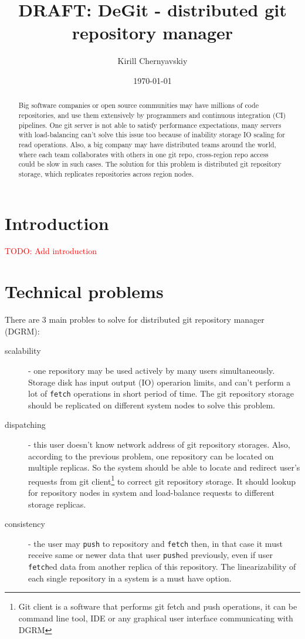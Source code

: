 \documentclass[12pt,oneside]{article}
\date{\small\today}
\title{%
  DRAFT: DeGit - distributed git repository manager\\
  \colorbox{firebrick}{\small\sffamily\color{white}{White Paper}}}
\author{Kirill Chernyavskiy}
\newcommand{\code}[1]{\texttt{#1}}
\newcommand{\todo}[1]{\textcolor{red}{TODO: #1}}
\begin{document}
\raggedbottom

\maketitle
\begin{abstract}
  Big software companies or open source communities 
  may have millions of code repositories,
  and use them extensively by programmers and continuous integration (CI) pipelines.
  One git server is not able to satisfy performance expectations,
  many servers with load-balancing can't solve this issue too because
  of inability storage IO scaling for read operations.
  Also, a big company may have distributed teams around the world,
  where each team collaborates with others in one git repo,
  cross-region repo access could be slow in such cases.
  The solution for this problem is distributed git repository storage,
  which replicates repositories across region nodes.
\end{abstract}

\section{Introduction}

\todo{Add introduction}

\section{Technical problems}

There are 3 main probles to solve for distributed git repository manager (DGRM):
\begin{description}
\item[scalability] - one repository may be used actively by many users simultaneously. Storage disk
  has input output (IO) operarion limits, and can't perform a lot of \code{fetch} operations in
  short period of time. The git repository storage should be replicated on different system nodes to
  solve this problem.
\item[dispatching] - this user doesn't know network address of git repository storages. Also, according to the
  previous problem, one repository can be located on multiple replicas.
  So the system should be able to locate and redirect user's requests
  from git client\footnote{Git client is a software that performs git fetch and push operations, it can be
  command line tool, IDE or any graphical user interface communicating with DGRM} to correct git repository
  storage. It should lookup for repository nodes in system and load-balance requests to different storage replicas.
\item[consistency] - the user may \code{push} to repository and \code{fetch} then, in that case it must receive
  same or newer data that user \code{push}ed previously, even if user \code{fetch}ed data from another
  replica of this repository. The linearizability of each single repository in a system is a must have option.
\end{description}
\end{document}
